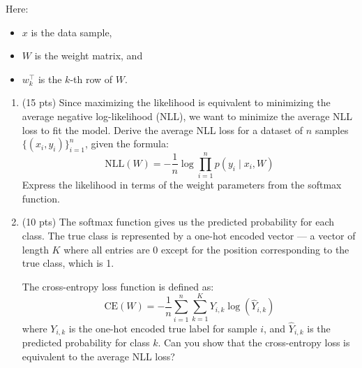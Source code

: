 \documentclass[11pt]{article}
\begin{document}
Here:
\begin{itemize}
    \item $x$ is the data sample,
    \item $W$ is the weight matrix, and
    \item $w_k^\top$ is the $k$-th row of $W$.
\end{itemize}


    \begin{enumerate}

\item (15 pts)
    Since maximizing the likelihood is equivalent to minimizing the average negative log-likelihood (NLL), we want to minimize the average NLL loss to fit the model. Derive the average NLL loss for a dataset of \( n \) samples \( \{(x_i, y_i)\}_{i=1}^n \), given the formula:
    \[
    \mathrm{NLL}(W) = -\frac{1}{n} \log \prod_{i=1}^n p(y_i \mid x_i, W)
    \]
    Express the likelihood in terms of the weight parameters from the softmax function.
    
    
\begin{answertext}{9cm}{}


  
\end{answertext} 

    \item (10 pts)
    The softmax function gives us the predicted probability for each class. The true class is represented by a one-hot encoded vector — a vector of length \( K \) where all entries are 0 except for the position corresponding to the true class, which is 1. 
    
    The cross-entropy loss function is defined as: \[
\mathrm{CE}(W) = -\frac{1}{n}\sum_{i=1}^n\sum_{k=1}^K Y_{i,k} \log(\hat{Y}_{i,k})
\] where \(Y_{i,k}\) is the one-hot encoded true label for sample \(i\), and \(\hat{Y}_{i,k}\) is the predicted probability for class \(k\). Can you show that the cross-entropy loss is equivalent to the average NLL loss? 

\begin{answertext}{9cm}{}


  
\end{answertext} 

\end{enumerate}
\end{document}
